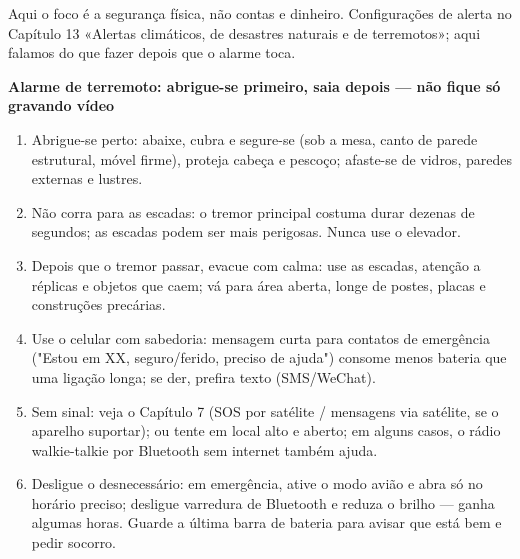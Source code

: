 


Aqui o foco é a segurança física, não contas e dinheiro. Configurações de alerta no Capítulo 13 «Alertas climáticos, de desastres naturais e de terremotos»; aqui falamos do que fazer depois que o alarme toca.

\textbf{Alarme de terremoto: abrigue-se primeiro, saia depois — não fique só gravando vídeo}\par

\begin{enumerate}
  \item Abrigue-se perto: abaixe, cubra e segure-se (sob a mesa, canto de parede estrutural, móvel firme), proteja cabeça e pescoço; afaste-se de vidros, paredes externas e lustres.
  \item Não corra para as escadas: o tremor principal costuma durar dezenas de segundos; as escadas podem ser mais perigosas. Nunca use o elevador.
  \item Depois que o tremor passar, evacue com calma: use as escadas, atenção a réplicas e objetos que caem; vá para área aberta, longe de postes, placas e construções precárias.
  \item Use o celular com sabedoria: mensagem curta para contatos de emergência ("Estou em XX, seguro/ferido, preciso de ajuda") consome menos bateria que uma ligação longa; se der, prefira texto (SMS/WeChat).
  \item Sem sinal: veja o Capítulo 7 (SOS por satélite / mensagens via satélite, se o aparelho suportar); ou tente em local alto e aberto; em alguns casos, o rádio walkie-talkie por Bluetooth sem internet também ajuda.
  \item Desligue o desnecessário: em emergência, ative o modo avião e abra só no horário preciso; desligue varredura de Bluetooth e reduza o brilho — ganha algumas horas. Guarde a última barra de bateria para avisar que está bem e pedir socorro.
\end{enumerate}

